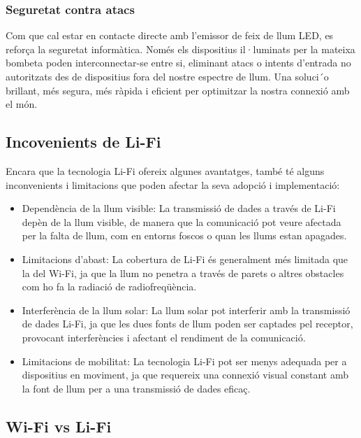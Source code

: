 \subsubsection*{Seguretat contra atacs}

Com que cal estar en contacte directe amb l'emissor de feix de llum LED, es reforça la seguretat
informàtica. Només els dispositius il·luminats per la mateixa bombeta poden interconnectar-se entre si,
eliminant atacs o intents d'entrada no autoritzats des de dispositius fora del nostre espectre de
llum.
Una soluci´o brillant, més segura, més ràpida i eficient per optimitzar la nostra connexió amb el
món.


\subsection*{Incovenients de Li-Fi}

Encara que la tecnologia Li-Fi ofereix algunes avantatges, també té alguns inconvenients i limitacions que poden afectar la seva adopció i implementació:


\begin{itemize}
    \item Dependència de la llum visible: La transmissió de dades a través de Li-Fi depèn de la llum visible, de manera que la comunicació pot veure afectada per la falta de llum, com en entorns foscos o quan les llums estan apagades.
    \item Limitacions d'abast: La cobertura de Li-Fi és generalment més limitada que la del Wi-Fi, ja que la llum no penetra a través de parets o altres obstacles com ho fa la radiació de radiofreqüència.
    \item Interferència de la llum solar: La llum solar pot interferir amb la transmissió de dades Li-Fi, ja que les dues fonts de llum poden ser captades pel receptor, provocant interferències i afectant el rendiment de la comunicació.
    \item Limitacions de mobilitat: La tecnologia Li-Fi pot ser menys adequada per a dispositius en moviment, ja que requereix una connexió visual constant amb la font de llum per a una transmissió de dades eficaç.
\end{itemize}








\subsection*{Wi-Fi vs Li-Fi}


